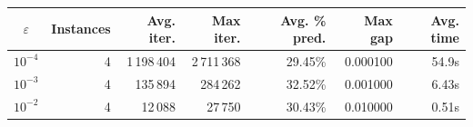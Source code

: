 \begin{tabular}{crrrrrr}
\toprule
$\varepsilon$ & Instances & Avg. iter. & Max iter. & Avg. \% pred. & Max gap & Avg. time \\
\midrule
$10^{-4}$ & 4 & 1\,198\,404 & 2\,711\,368 & 29.45\% & 0.000100 & 54.9s \\
$10^{-3}$ & 4 & 135\,894 & 284\,262 & 32.52\% & 0.001000 & 6.43s \\
$10^{-2}$ & 4 & 12\,088 & 27\,750 & 30.43\% & 0.010000 & 0.51s \\
\bottomrule
\end{tabular}